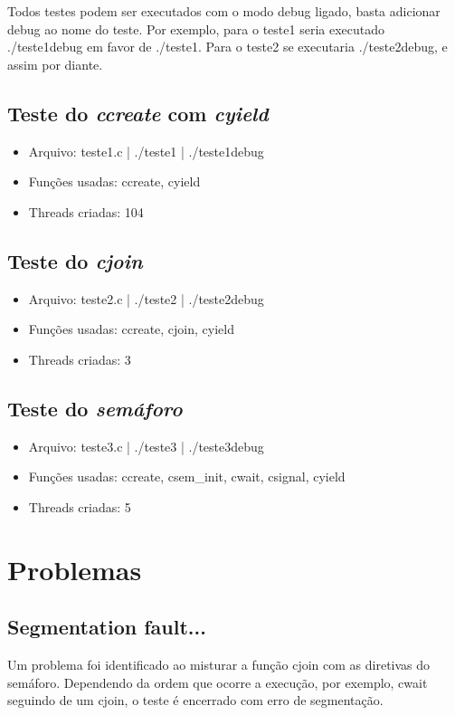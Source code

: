 \documentclass{article}
\begin{document}
Todos testes podem ser executados com o modo debug ligado, basta adicionar debug ao nome do teste. Por exemplo, para o teste1 seria executado ./teste1debug em favor de ./teste1. Para o teste2 se executaria ./teste2debug, e assim por diante.

\subsection{Teste do \textit{ccreate} com \textit{cyield}}
\begin{itemize}
\item Arquivo: teste1.c | ./teste1 | ./teste1debug
\item Funções usadas: ccreate, cyield
\item Threads criadas: 104
\end{itemize}

\subsection{Teste do \textit{cjoin}}
\begin{itemize}
\item Arquivo: teste2.c | ./teste2 | ./teste2debug
\item Funções usadas: ccreate, cjoin, cyield
\item Threads criadas: 3
\end{itemize}

\subsection{Teste do \textit{semáforo}}
\begin{itemize}
\item Arquivo: teste3.c | ./teste3 | ./teste3debug
\item Funções usadas: ccreate, csem\_init, cwait, csignal, cyield
\item Threads criadas: 5
\end{itemize}

\section{Problemas}
\subsection{Segmentation fault...}
Um problema foi identificado ao misturar a função cjoin com as diretivas do semáforo. Dependendo da ordem que ocorre a execução, por exemplo, cwait seguindo de um cjoin, o teste é encerrado com erro de segmentação.
\end{document}
